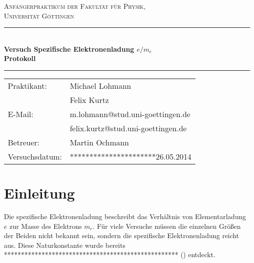 \documentclass[12pt,a4paper,titlepage,headinclude,bibtotoc]{scrartcl}
\begin{document}
\begin{titlepage}
\centering
\textsc{\Large Anfängerpraktikum der Fakultät für
  Physik,\\[1.5ex] Universität Göttingen}

\vspace*{3cm}

\rule{\textwidth}{1pt}\\[0.5cm]
{\huge \bfseries
  Versuch Spezifische Elektronenladung $e/m_e$\\[1.5ex]
  Protokoll}\\[0.5cm]
\rule{\textwidth}{1pt}

\vspace*{3cm}

\begin{Large}
\begin{tabular}{ll}
Praktikant: &  Michael Lohmann\\
 &  Felix Kurtz\\
 E-Mail: & m.lohmann@stud.uni-goettingen.de\\
 &  felix.kurtz@stud.uni-goettingen.de\\
 Betreuer: & Martin Ochmann\\
 Versuchsdatum: & **********************26.05.2014\\
\end{tabular}
\end{Large}

\vspace*{0.8cm}

\begin{Large}
\end{Large}

\end{titlepage}

\tableofcontents

\newpage

\section{Einleitung}
\label{sec:einleitung}
Die spezifische Elektronenladung beschreibt das Verhältnis von Elementarladung $e$ zur Masse des Elektrons $m_e$.
Für viele Versuche müssen die einzelnen Größen der Beiden nicht bekannt sein, sondern die spezifische Elektronenladung reicht aus.
Diese Naturkonstante wurde bereits *************************************************** (\cite[S. ]{gerthsen}) entdeckt.
\end{document}
